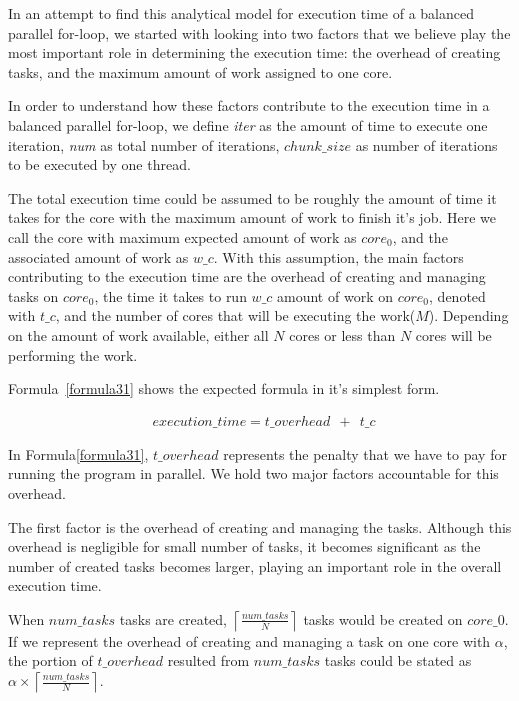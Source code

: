 In an attempt to find this analytical model for execution time of a balanced parallel for-loop, we started with looking into two factors that we believe play the most important role in determining the execution time: the overhead of creating tasks, and the maximum amount of work assigned to one core. 

In order to understand how these factors contribute to the execution time in a balanced parallel for-loop, we define \emph{iter} as the amount of time to execute one iteration, \emph{num } as total number of iterations, $chunk\_{size}$ as number of iterations to be executed by one thread.


The total execution time could be assumed to be roughly the amount of time it takes for the core with the maximum amount of work to finish it's job. Here we call the core with maximum expected amount of work as $core_0$, and the associated amount of work as $w\_c$. 
With this assumption, the main factors contributing to the execution time are the overhead of creating and managing tasks on $core_0$, the time it takes to run $w\_c$ amount of work on $core_0$, denoted with $t\_{c}$, and the number of cores that will be executing the work($M$). Depending on the amount of work available, either all $N$ cores or less than $N$ cores will be performing the work.

Formula~\ref{formula31} shows the expected formula in it's simplest form.

\begin{equation}\label{formula31}
\begin{aligned}
&execution\_time = 
t\_{overhead}\:\:+\:\:t\_c\
\end{aligned}
\end{equation}


In Formula\ref{formula31}, $t\_{overhead}$ represents the penalty that we have to pay for running the program in parallel. We hold two major factors accountable for this overhead. 

The first factor is the overhead of creating and managing the tasks. Although this overhead is negligible for small number of tasks, it becomes significant as the number of created tasks becomes larger, playing an important role in the overall execution time.

When $num\_{tasks}$ tasks are created, $\left\lceil{\frac{num\_{tasks}}{N}}\right \rceil$ tasks would be created on $core\_0$. If we represent the overhead of creating and managing a task on one core with $\alpha$, the portion of $t\_{overhead}$ resulted from $num\_{tasks}$ tasks could be stated as $\alpha\times{\left\lceil{\frac{num\_{tasks}}{N}}\right \rceil}$.


